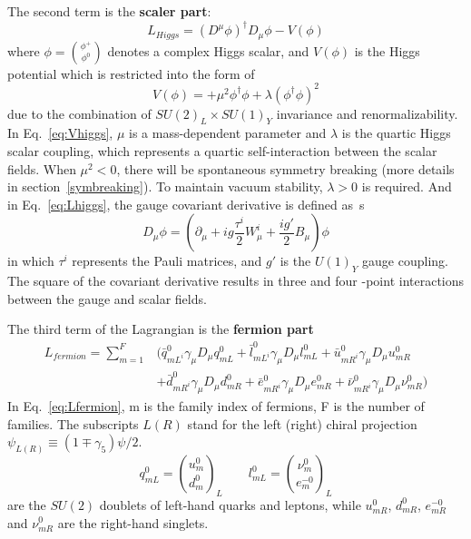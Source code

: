 The second term is the \textbf{scaler part}:
\begin{equation} \label{eq:Lhiggs}
	{L}_{Higgs} = \left(D^{\mu}\phi\right)^{\dagger}D_{\mu}\phi - V(\phi)
\end{equation}
where $\phi = \binom{\phi^{+}}{\phi^{0}}$ denotes a complex Higgs scalar,
and $V(\phi)$ is the Higgs potential which is restricted into the form of 
\begin{equation} \label{eq:Vhiggs}
	V(\phi) = +\mu^{2}\phi^{\dagger}\phi + \lambda\left(\phi^{\dagger}\phi\right)^{2}
\end{equation}
due to the combination of $SU(2)_{L} \times SU(1)_{Y}$ invariance and renormalizability.
In Eq.~\ref{eq:Vhiggs}, $\mu$ is a mass-dependent parameter and $\lambda$ is the quartic Higgs scalar coupling, 
which represents a quartic self-interaction between the scalar fields.
When $\mu^{2} < 0$, there will be spontaneous symmetry breaking (more details in section~\ref{symbreaking}).
To maintain vacuum stability, $\lambda > 0$ is required.
And in Eq.~\ref{eq:Lhiggs}, the gauge covariant derivative is defined as~\cite{Langacker:2009my}s
\begin{equation}
	D_{\mu}\phi = \left(\partial_{\mu} +ig\frac{\tau^{i}}{2}W_{\mu}^{i} + \frac{ig'}{2}B_{\mu}\right)\phi
\end{equation}
in which $\tau^{i}$ represents the Pauli matrices, and $g'$ is the $U(1)_{Y}$ gauge coupling.
The square of the covariant derivative results in three and four -point interactions between the gauge and scalar fields.

The third term of the Lagrangian is the \textbf{fermion part}
\begin{equation} \label{eq:Lfermion}
\begin{split}
  	{L}_{fermion} = \sum_{m=1}^{F} & ( \bar{q}_{mL^{i}}^{0}\gamma_{\mu}D_{\mu}q_{mL}^{0} + \bar{l}_{mL^{i}}^{0}\gamma_{\mu}D_{\mu}l_{mL}^{0} + \bar{u}_{mR^{i}}^{0}\gamma_{\mu}D_{\mu}u_{mR}^{0} \\
  	& + \bar{d}_{mR^{i}}^{0}\gamma_{\mu}D_{\mu}d_{mR}^{0} + \bar{e}_{mR^{i}}^{0}\gamma_{\mu}D_{\mu}e_{mR}^{0} + \bar{\nu}_{mR^{i}}^{0}\gamma_{\mu}D_{\mu}\nu_{mR}^{0})
\end{split}
\end{equation} 
In Eq.~\ref{eq:Lfermion}, m is the family index of fermions, F is the number of families.
The subscripts $L (R)$ stand for the left (right) chiral projection $\psi_{L(R)} \equiv \left(1 \mp \gamma_{5} \right) \psi/2$.
\begin{equation}
	q_{mL}^{0} = \binom{u_{m}^{0}}{d_{m}^{0}}_{L}   \qquad    l_{mL}^{0} = \binom{\nu_{m}^{0}}{e_{m}^{-0}}_{L}
\end{equation}
are the $SU(2)$ doublets of left-hand quarks and leptons, while 
$u_{mR}^{0}$, $d_{mR}^{0}$, $e_{mR}^{-0}$ and $\nu_{mR}^{0}$ are the right-hand singlets.


